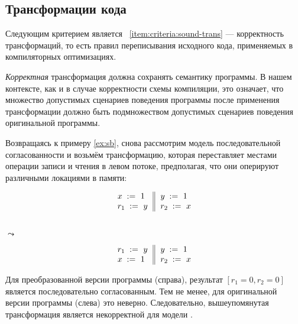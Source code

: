 \subsection{Трансформации кода}
\label{sec:background:trans}

Следующим критерием является ~\ref{item:criteria:sound-trans} ---
корректность трансформаций, то есть правил переписывания 
исходного кода, применяемых в компиляторных оптимизациях. 

\emph{Корректная} трансформация должна сохранять семантику программы. 
В нашем контексте, как и в случае корректности схемы компиляции,
это означает, что множество допустимых сценариев поведения 
программы после применения трансформации должно 
быть подмножеством допустимых сценариев поведения оригинальной программы.

Возвращаясь к примеру \ref{ex:sb},
снова рассмотрим модель последовательной согласованности 
и возьмём трансформацию, которая переставляет местами 
операции записи и  чтения в левом потоке, предполагая, 
что они оперируют различными локациями в памяти:

\begin{minipage}{0.45\linewidth}
\begin{equation*}
\inarrII{
   \writeInst{}{x}{1}   \\
   \readInst{}{r_1}{y}  \\
}{
  \writeInst{}{y}{1}   \\
  \readInst{}{r_2}{x}  \\
}
\end{equation*}
\end{minipage}\hfill%
\begin{minipage}{0.05\linewidth}
\Large~\\ $\leadsto$
\end{minipage}\hfill%
\begin{minipage}{0.45\linewidth}
\begin{equation*}
\inarrII{
   \readInst{}{r_1}{y}  \\
   \writeInst{}{x}{1}   \\
}{
  \writeInst{}{y}{1}   \\
  \readInst{}{r_2}{x}  \\
}
\end{equation*}
\end{minipage}

Для преобразованной версии программы (справа),
результат $[r_1=0, r_2=0]$ является последовательно согласованным. 
Тем не менее, для оригинальной версии программы (слева) это неверно. 
Следовательно, вышеупомянутая трансформация 
является некорректной для модели \SC. 

